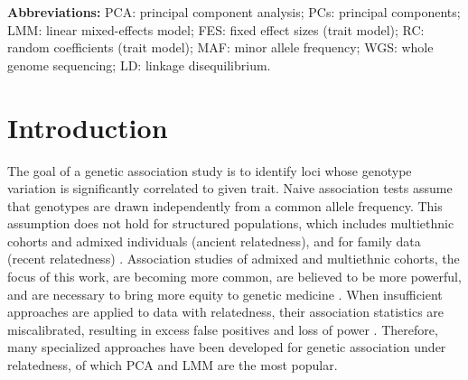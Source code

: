 \documentclass[11pt]{article}
\begin{document}
\begin{linenumbers}
\textbf{Abbreviations:}
PCA: principal component analysis;
PCs: principal components;
LMM: linear mixed-effects model;
FES: fixed effect sizes (trait model);
RC: random coefficients (trait model);
MAF: minor allele frequency;
WGS: whole genome sequencing;
LD: linkage disequilibrium.

\section{Introduction} 

The goal of a genetic association study is to identify loci whose genotype variation is significantly correlated to given trait.
Naive association tests assume that genotypes are drawn independently from a common allele frequency.
This assumption does not hold for structured populations, which includes multiethnic cohorts and admixed individuals (ancient relatedness), and for family data (recent relatedness) \citep{astle_population_2009}.
Association studies of admixed and multiethnic cohorts, the focus of this work, are becoming more common, are believed to be more powerful, and are necessary to bring more equity to genetic medicine \citep{rosenberg_genome-wide_2010, hoffman_correcting_2013, coram_genome-wide_2013, medina-gomez_challenges_2015, conomos_genetic_2016, hodonsky_genome-wide_2017, martin_human_2017, martin_unexpectedly_2017, hindorff_prioritizing_2018, hoffmann_large_2018, mogil_genetic_2018, roselli_multi-ethnic_2018, wojcik_genetic_2019, peterson_genome-wide_2019, zhong_using_2019, hu_minority-centric_2020, simonin-wilmer_overview_2021, kamariza_misuse_2021, lin_admixed_2021, mahajan_multi-ancestry_2022, hou_causal_2023}.
When insufficient approaches are applied to data with relatedness, their association statistics are miscalibrated, resulting in excess false positives and loss of power \citep{devlin_genomic_1999, voight_confounding_2005, astle_population_2009}.
Therefore, many specialized approaches have been developed for genetic association under relatedness, of which PCA and LMM are the most popular.


\end{linenumbers}
\end{document}

